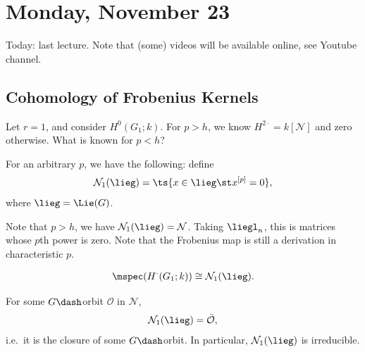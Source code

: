 \hypertarget{monday-november-23}{%
\section{Monday, November 23}\label{monday-november-23}}

Today: last lecture. Note that (some) videos will be available online,
see Youtube channel.

\hypertarget{cohomology-of-frobenius-kernels-1}{%
\subsection{Cohomology of Frobenius
Kernels}\label{cohomology-of-frobenius-kernels-1}}

Let \(r=1\), and consider \(H^0(G_1; k)\). For \(p > h\), we know
\(H^{2\cdot} = k[\mathcal{N}]\) and zero otherwise. What is known for
\(p<h\)?

\begin{definition}

For an arbitrary \(p\), we have the following: define
\begin{align*}  
\mathcal{N}_1(\lieg) = \ts{x\in \lieg \st x^{[p]} = 0 }
,\end{align*} where \(\lieg = \Lie(G)\).

\end{definition}

Note that \(p>h\), we have \(\mathcal{N}_1(\lieg) = \mathcal{N}\).
Taking \(\liegl_n\), this is matrices whose \(p\)th power is zero. Note
that the Frobenius map is still a derivation in characteristic \(p\).

\begin{theorem}[Jantzen, 1986]

\begin{align*}  
\mspec(H^\cdot(G_1; k) ) \cong \mathcal{N}_1(\lieg)
.\end{align*}

\end{theorem}

\begin{theorem}

For some \(G\dash\)orbit \(\mathcal{O}\) in \(\mathcal{N}\),
\begin{align*}  
\mathcal{N}_1(\lieg) = \bar{\mathcal{O}}
,\end{align*} i.e.~it is the closure of some \(G\dash\)orbit. In
particular, \(\mathcal{N}_1(\lieg)\) is irreducible.

\end{theorem}

